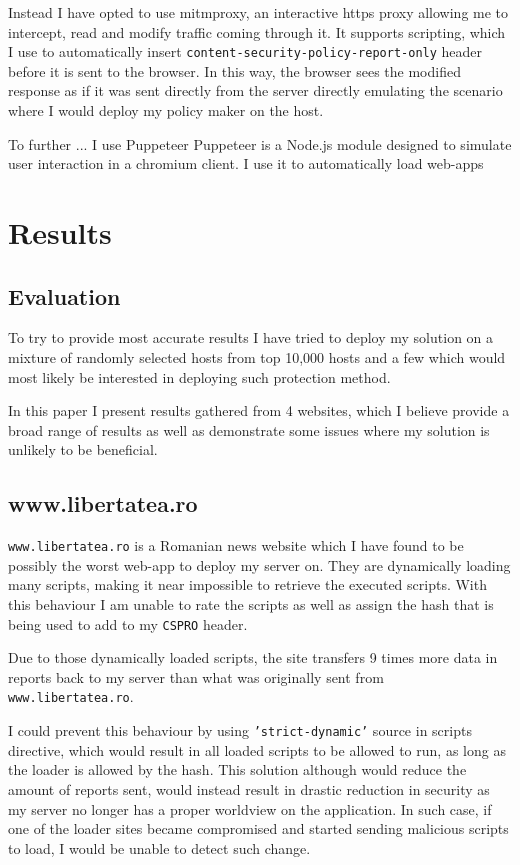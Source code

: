 Instead I have opted to use mitmproxy, an interactive https proxy allowing me to intercept, read and modify traffic coming through it.
It supports scripting, which I use to automatically insert \texttt{content-security-policy-report-only} header before it is sent to the browser.
In this way, the browser sees the modified response as if it was sent directly from the server directly emulating the scenario where I would deploy my policy maker on the host.

To further ... I use Puppeteer
Puppeteer is a Node.js module designed to simulate user interaction in a chromium client.
I use it to automatically load web-apps 

\section{Results}

\subsection{Evaluation}

To try to provide most accurate results I have tried to deploy my solution on a mixture of randomly selected hosts from top 10,000 hosts and a few which would most likely be interested in deploying such protection method.

In this paper I present results gathered from 4 websites, which I believe provide a broad range of results as well as demonstrate some issues where my solution is unlikely to be beneficial.

\subsection{www.libertatea.ro}

\texttt{www.libertatea.ro} is a Romanian news website which I have found to be possibly the worst web-app to deploy my server on.
They are dynamically loading many scripts, making it near impossible to retrieve the executed scripts.
With this behaviour I am unable to rate the scripts as well as assign the hash that is being used to add to my \texttt{CSPRO} header.

Due to those dynamically loaded scripts, the site transfers 9 times more data in reports back to my server than what was originally sent from \texttt{www.libertatea.ro}.

I could prevent this behaviour by using \texttt{'strict-dynamic'} source in scripts directive, which would result in all loaded scripts to be allowed to run, as long as the loader is allowed by the hash.
This solution although would reduce the amount of reports sent, would instead result in drastic reduction in security as my server no longer has a proper worldview on the application.
In such case, if one of the loader sites became compromised and started sending malicious scripts to load, I would be unable to detect such change.

